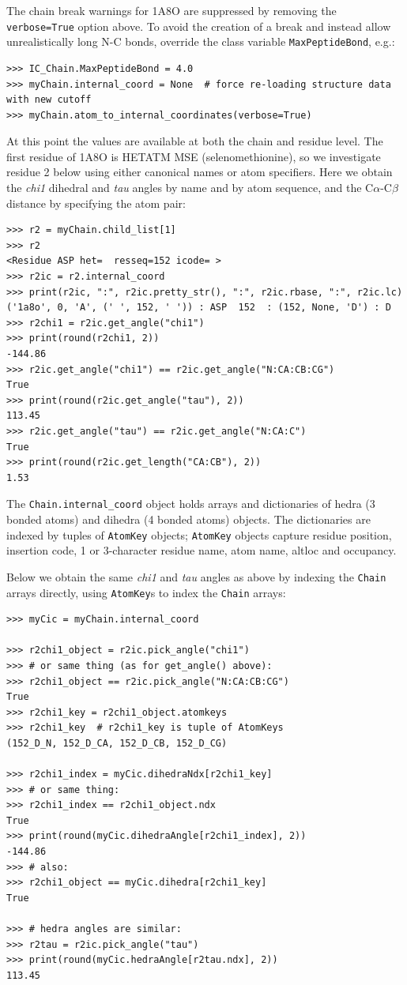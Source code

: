 The chain break warnings for 1A8O are suppressed by removing the \texttt{verbose=True}
option above. To avoid the creation of a break and instead allow unrealistically long
N-C bonds, override the class variable \texttt{MaxPeptideBond}, e.g.:

\begin{verbatim}
>>> IC_Chain.MaxPeptideBond = 4.0
>>> myChain.internal_coord = None  # force re-loading structure data with new cutoff
>>> myChain.atom_to_internal_coordinates(verbose=True)
\end{verbatim}

At this point the values are available at both the chain and residue level.  The
first residue of 1A8O is HETATM MSE (selenomethionine), so we investigate residue 2
below using either canonical names or atom specifiers.  Here we obtain the \textit{chi1}
dihedral and \textit{tau} angles by name and by atom sequence, and the C$\alpha$-C$\beta$
distance by specifying the atom pair:

\begin{verbatim}
>>> r2 = myChain.child_list[1]
>>> r2
<Residue ASP het=  resseq=152 icode= >
>>> r2ic = r2.internal_coord
>>> print(r2ic, ":", r2ic.pretty_str(), ":", r2ic.rbase, ":", r2ic.lc)
('1a8o', 0, 'A', (' ', 152, ' ')) : ASP  152  : (152, None, 'D') : D
>>> r2chi1 = r2ic.get_angle("chi1")
>>> print(round(r2chi1, 2))
-144.86
>>> r2ic.get_angle("chi1") == r2ic.get_angle("N:CA:CB:CG")
True
>>> print(round(r2ic.get_angle("tau"), 2))
113.45
>>> r2ic.get_angle("tau") == r2ic.get_angle("N:CA:C")
True
>>> print(round(r2ic.get_length("CA:CB"), 2))
1.53
\end{verbatim}

The \texttt{Chain.internal\_coord} object holds arrays and dictionaries of hedra (3
bonded atoms) and dihedra (4 bonded atoms) objects.  The dictionaries are indexed
by tuples of \texttt{AtomKey} objects; \texttt{AtomKey} objects capture residue position, insertion
code, 1 or 3-character residue name, atom name, altloc and occupancy.

Below we obtain the same \textit{chi1} and \textit{tau} angles as above by indexing the \texttt{Chain}
arrays directly, using \texttt{AtomKey}s to index the \texttt{Chain} arrays:

\begin{verbatim}
>>> myCic = myChain.internal_coord

>>> r2chi1_object = r2ic.pick_angle("chi1")
>>> # or same thing (as for get_angle() above):
>>> r2chi1_object == r2ic.pick_angle("N:CA:CB:CG")
True
>>> r2chi1_key = r2chi1_object.atomkeys
>>> r2chi1_key  # r2chi1_key is tuple of AtomKeys
(152_D_N, 152_D_CA, 152_D_CB, 152_D_CG)

>>> r2chi1_index = myCic.dihedraNdx[r2chi1_key]
>>> # or same thing:
>>> r2chi1_index == r2chi1_object.ndx
True
>>> print(round(myCic.dihedraAngle[r2chi1_index], 2))
-144.86
>>> # also:
>>> r2chi1_object == myCic.dihedra[r2chi1_key]
True

>>> # hedra angles are similar:
>>> r2tau = r2ic.pick_angle("tau")
>>> print(round(myCic.hedraAngle[r2tau.ndx], 2))
113.45
\end{verbatim}

